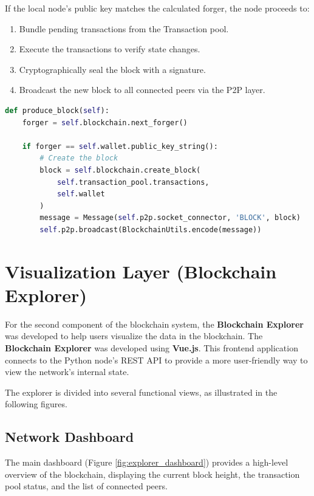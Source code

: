 If the local node's public key matches the calculated forger, the node proceeds to:
\begin{enumerate}
    \item Bundle pending transactions from the Transaction pool.
    \item Execute the transactions to verify state changes.
    \item Cryptographically seal the block with a signature.
    \item Broadcast the new block to all connected peers via the P2P layer.
\end{enumerate}

\begin{lstlisting}[language=Python, caption=Block Production Logic, label=lst:produce_block]
def produce_block(self):
    forger = self.blockchain.next_forger()
    
    if forger == self.wallet.public_key_string():
        # Create the block
        block = self.blockchain.create_block(
            self.transaction_pool.transactions, 
            self.wallet
        )
        message = Message(self.p2p.socket_connector, 'BLOCK', block)
        self.p2p.broadcast(BlockchainUtils.encode(message))
\end{lstlisting}

\section{Visualization Layer (Blockchain Explorer)} \label{ch4_explorer}

For the second component of the blockchain system, the \textbf{Blockchain Explorer} was developed to help users visualize the data in the blockchain. The \textbf{Blockchain Explorer} was developed using \textbf{Vue.js}. This frontend application connects to the Python node's REST API to provide a more user-friendly way to view the network's internal state.

The explorer is divided into several functional views, as illustrated in the following figures.

\newpage

\subsection{Network Dashboard}
The main dashboard (Figure \ref{fig:explorer_dashboard}) provides a high-level overview of the blockchain, displaying the current block height, the transaction pool status, and the list of connected peers.

